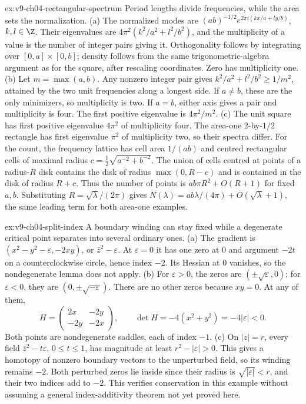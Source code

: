\begin{solution}{ex:v9-ch04-rectangular-spectrum}
\idea Period lengths divide frequencies, while the area sets the normalization.
\writeup (a) The normalized modes are $(ab)^{-1/2}e^{2\pi i(kx/a+ly/b)}$, $k,l\in\Z$. Their eigenvalues are $4\pi^2(k^2/a^2+l^2/b^2)$, and the multiplicity of a value is the number of integer pairs giving it. Orthogonality follows by integrating over $[0,a]\times[0,b]$; density follows from the same trigonometric-algebra argument as for the square, after rescaling coordinates. Zero has multiplicity one.
(b) Let $m=\max(a,b)$. Any nonzero integer pair gives $k^2/a^2+l^2/b^2\ge1/m^2$, attained by the two unit frequencies along a longest side. If $a\ne b$, these are the only minimizers, so multiplicity is two. If $a=b$, either axis gives a pair and multiplicity is four. The first positive eigenvalue is $4\pi^2/m^2$.
(c) The unit square has first positive eigenvalue $4\pi^2$ of multiplicity four. The area-one $2$-by-$1/2$ rectangle has first eigenvalue $\pi^2$ of multiplicity two, so their spectra differ. For the count, the frequency lattice has cell area $1/(ab)$ and centred rectangular cells of maximal radius $c=\tfrac12\sqrt{a^{-2}+b^{-2}}$. The union of cells centred at points of a radius-$R$ disk contains the disk of radius $\max(0,R-c)$ and is contained in the disk of radius $R+c$. Thus the number of points is $ab\pi R^2+O(R+1)$ for fixed $a,b$. Substituting $R=\sqrt\lambda/(2\pi)$ gives $N(\lambda)=ab\lambda/(4\pi)+O(\sqrt\lambda+1)$, the same leading term for both area-one examples.
\end{solution}

\begin{solution}{ex:v9-ch04-split-index}
\idea A boundary winding can stay fixed while a degenerate critical point separates into several ordinary ones.
\writeup (a) The gradient is $(x^2-y^2-\varepsilon,-2xy)$, or $\bar z^2-\varepsilon$. At $\varepsilon=0$ it has one zero at $0$ and argument $-2t$ on a counterclockwise circle, hence index $-2$. Its Hessian at $0$ vanishes, so the nondegenerate lemma does not apply.
(b) For $\varepsilon>0$, the zeros are $(\pm\sqrt\varepsilon,0)$; for $\varepsilon<0$, they are $(0,\pm\sqrt{-\varepsilon})$. There are no other zeros because $xy=0$. At any of them,
\[
H=\begin{pmatrix}2x&-2y\\-2y&-2x\end{pmatrix},\qquad
\det H=-4(x^2+y^2)=-4|\varepsilon|<0.
\]
Both points are nondegenerate saddles, each of index $-1$.
(c) On $|z|=r$, every field $\bar z^2-t\varepsilon$, $0\le t\le1$, has magnitude at least $r^2-|\varepsilon|>0$. This gives a homotopy of nonzero boundary vectors to the unperturbed field, so its winding remains $-2$. Both perturbed zeros lie inside since their radius is $\sqrt{|\varepsilon|}<r$, and their two indices add to $-2$. This verifies conservation in this example without assuming a general index-additivity theorem not yet proved here.
\end{solution}

